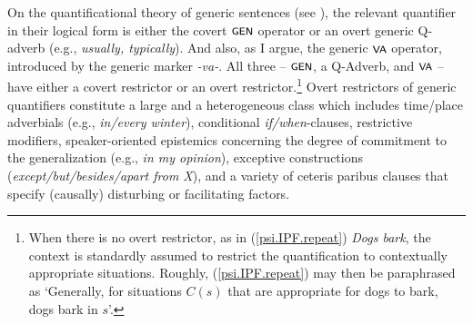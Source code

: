 \documentclass[output=paper,colorlinks,citecolor=brown]{langscibook}
\begin{document}
On the quantificational theory of generic sentences (see ), the relevant quantifier in their logical form is either
the covert $\cnst{Gen}$ operator or an overt generic Q-adverb
(e.g., \textit{usually, typically}).  And also, as I argue,
the generic $\cnst{va}$ operator, introduced by the generic marker \textit{-va-}.
All three -- $\cnst{Gen}$, a Q-Adverb, and $\cnst{va}$ -- have either a covert restrictor or an overt restrictor.\footnote{When there is no overt restrictor, as in (\ref{psi.IPF.repeat}) \textit{Dogs bark}, the context is standardly assumed to restrict the quantification to contextually appropriate situations. Roughly, (\ref{psi.IPF.repeat}) may then be paraphrased as ‘Generally, for situations $C(s)$ that are appropriate for dogs to bark, dogs bark in $s$’.}
Overt restrictors of generic quantifiers constitute a large and a heterogeneous class which
includes time/place adverbials (e.g., \textit{in/every winter}), conditional \textit{if/when}-clauses, restrictive modifiers, speaker-oriented epistemics concerning the degree of commitment to the generalization (e.g., \textit{in my opinion}), exceptive constructions (\textit{except/but/besides/apart from X}), and a variety of ceteris paribus clauses that specify (causally) disturbing or facilitating factors.
\end{document}
